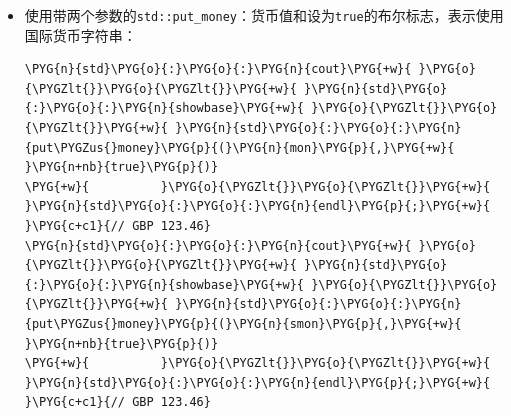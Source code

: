 \begin{itemize}
\begin{codeblockbg}
\begin{Verbatim}[commandchars=\\\{\},breaklines=true,breakanywhere=true,fontsize=\codefont,xleftmargin=17bp]
\PYG{n}{std}\PYG{o}{:}\PYG{o}{:}\PYG{n}{cout}\PYG{+w}{ }\PYG{o}{\PYGZlt{}}\PYG{o}{\PYGZlt{}}\PYG{+w}{ }\PYG{n}{std}\PYG{o}{:}\PYG{o}{:}\PYG{n}{showbase}\PYG{+w}{ }\PYG{o}{\PYGZlt{}}\PYG{o}{\PYGZlt{}}\PYG{+w}{ }\PYG{n}{std}\PYG{o}{:}\PYG{o}{:}\PYG{n}{put\PYGZus{}money}\PYG{p}{(}\PYG{n}{mon}\PYG{p}{)}
\PYG{+w}{          }\PYG{o}{\PYGZlt{}}\PYG{o}{\PYGZlt{}}\PYG{+w}{ }\PYG{n}{std}\PYG{o}{:}\PYG{o}{:}\PYG{n}{endl}\PYG{p}{;}\PYG{+w}{ }\PYG{c+c1}{// £123.46}
\PYG{n}{std}\PYG{o}{:}\PYG{o}{:}\PYG{n}{cout}\PYG{+w}{ }\PYG{o}{\PYGZlt{}}\PYG{o}{\PYGZlt{}}\PYG{+w}{ }\PYG{n}{std}\PYG{o}{:}\PYG{o}{:}\PYG{n}{showbase}\PYG{+w}{ }\PYG{o}{\PYGZlt{}}\PYG{o}{\PYGZlt{}}\PYG{+w}{ }\PYG{n}{std}\PYG{o}{:}\PYG{o}{:}\PYG{n}{put\PYGZus{}money}\PYG{p}{(}\PYG{n}{smon}\PYG{p}{)}
\PYG{+w}{          }\PYG{o}{\PYGZlt{}}\PYG{o}{\PYGZlt{}}\PYG{+w}{ }\PYG{n}{std}\PYG{o}{:}\PYG{o}{:}\PYG{n}{endl}\PYG{p}{;}\PYG{+w}{ }\PYG{c+c1}{// £123.46}
\end{Verbatim}
\end{codeblockbg}



\item 使用带两个参数的\texttt{std::\allowbreak{}put\_\allowbreak{}money}：货币值和设为\texttt{true}的布尔标志，表示使用国际货币字符串：



\begin{codeblockbg}
\begin{Verbatim}[commandchars=\\\{\},breaklines=true,breakanywhere=true,fontsize=\codefont,xleftmargin=17bp]
\PYG{n}{std}\PYG{o}{:}\PYG{o}{:}\PYG{n}{cout}\PYG{+w}{ }\PYG{o}{\PYGZlt{}}\PYG{o}{\PYGZlt{}}\PYG{+w}{ }\PYG{n}{std}\PYG{o}{:}\PYG{o}{:}\PYG{n}{showbase}\PYG{+w}{ }\PYG{o}{\PYGZlt{}}\PYG{o}{\PYGZlt{}}\PYG{+w}{ }\PYG{n}{std}\PYG{o}{:}\PYG{o}{:}\PYG{n}{put\PYGZus{}money}\PYG{p}{(}\PYG{n}{mon}\PYG{p}{,}\PYG{+w}{ }\PYG{n+nb}{true}\PYG{p}{)}
\PYG{+w}{          }\PYG{o}{\PYGZlt{}}\PYG{o}{\PYGZlt{}}\PYG{+w}{ }\PYG{n}{std}\PYG{o}{:}\PYG{o}{:}\PYG{n}{endl}\PYG{p}{;}\PYG{+w}{ }\PYG{c+c1}{// GBP 123.46}
\PYG{n}{std}\PYG{o}{:}\PYG{o}{:}\PYG{n}{cout}\PYG{+w}{ }\PYG{o}{\PYGZlt{}}\PYG{o}{\PYGZlt{}}\PYG{+w}{ }\PYG{n}{std}\PYG{o}{:}\PYG{o}{:}\PYG{n}{showbase}\PYG{+w}{ }\PYG{o}{\PYGZlt{}}\PYG{o}{\PYGZlt{}}\PYG{+w}{ }\PYG{n}{std}\PYG{o}{:}\PYG{o}{:}\PYG{n}{put\PYGZus{}money}\PYG{p}{(}\PYG{n}{smon}\PYG{p}{,}\PYG{+w}{ }\PYG{n+nb}{true}\PYG{p}{)}
\PYG{+w}{          }\PYG{o}{\PYGZlt{}}\PYG{o}{\PYGZlt{}}\PYG{+w}{ }\PYG{n}{std}\PYG{o}{:}\PYG{o}{:}\PYG{n}{endl}\PYG{p}{;}\PYG{+w}{ }\PYG{c+c1}{// GBP 123.46}
\end{Verbatim}
\end{codeblockbg}

\end{itemize}


